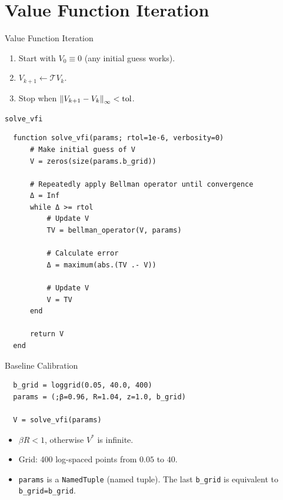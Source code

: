 \documentclass[10pt,aspectratio=169]{beamer}
\begin{document}
\section{Value Function Iteration}

\begin{frame}{Value Function Iteration}
  \begin{enumerate}
    \item Start with $V_0 \equiv 0$ (any initial guess works).
    \vspace{0.4em}
    \item $V_{k+1} \leftarrow \mathcal{T} V_k$.
    \vspace{0.4em}
    \item Stop when $\left\| V_{k+1} - V_k \right\|_\infty < \text{tol}$.
  \end{enumerate}
\end{frame}

\begin{frame}[fragile]{\texttt{solve\_vfi}}
  \begin{lstlisting}
  function solve_vfi(params; rtol=1e-6, verbosity=0)
      # Make initial guess of V
      V = zeros(size(params.b_grid))

      # Repeatedly apply Bellman operator until convergence
      Δ = Inf
      while Δ >= rtol
          # Update V
          TV = bellman_operator(V, params)

          # Calculate error
          Δ = maximum(abs.(TV .- V))

          # Update V
          V = TV
      end

      return V
  end
  \end{lstlisting}
\end{frame}

\begin{frame}[fragile]{Baseline Calibration}
  \begin{lstlisting}
  b_grid = loggrid(0.05, 40.0, 400)
  params = (;β=0.96, R=1.04, z=1.0, b_grid)

  V = solve_vfi(params)
  \end{lstlisting}
  \begin{itemize}
    \item \small $\beta R < 1$, otherwise $V^*$ is infinite.
    \item Grid: 400 log-spaced points from $0.05$ to $40$.
    \item \texttt{params} is a \texttt{NamedTuple} (named tuple). The last \texttt{b\_grid} is equivalent to \texttt{b\_grid=b\_grid}.
  \end{itemize}
\end{frame}
\end{document}
